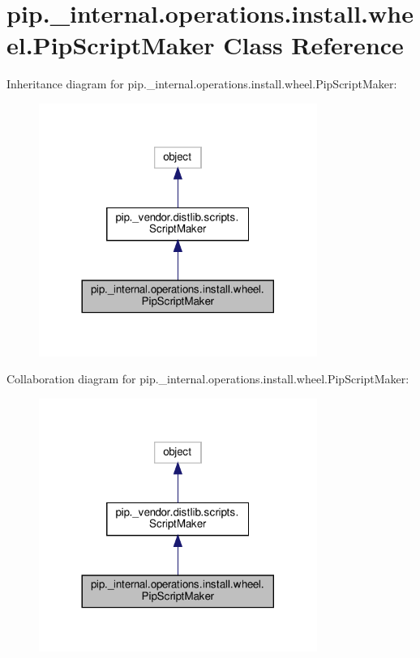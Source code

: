 \hypertarget{classpip_1_1__internal_1_1operations_1_1install_1_1wheel_1_1PipScriptMaker}{}\section{pip.\+\_\+internal.\+operations.\+install.\+wheel.\+Pip\+Script\+Maker Class Reference}
\label{classpip_1_1__internal_1_1operations_1_1install_1_1wheel_1_1PipScriptMaker}


Inheritance diagram for pip.\+\_\+internal.\+operations.\+install.\+wheel.\+Pip\+Script\+Maker\+:
\nopagebreak
\begin{figure}[H]
\begin{center}
\leavevmode
\includegraphics[width=257pt]{classpip_1_1__internal_1_1operations_1_1install_1_1wheel_1_1PipScriptMaker__inherit__graph}
\end{center}
\end{figure}


Collaboration diagram for pip.\+\_\+internal.\+operations.\+install.\+wheel.\+Pip\+Script\+Maker\+:
\nopagebreak
\begin{figure}[H]
\begin{center}
\leavevmode
\includegraphics[width=257pt]{classpip_1_1__internal_1_1operations_1_1install_1_1wheel_1_1PipScriptMaker__coll__graph}
\end{center}
\end{figure}

